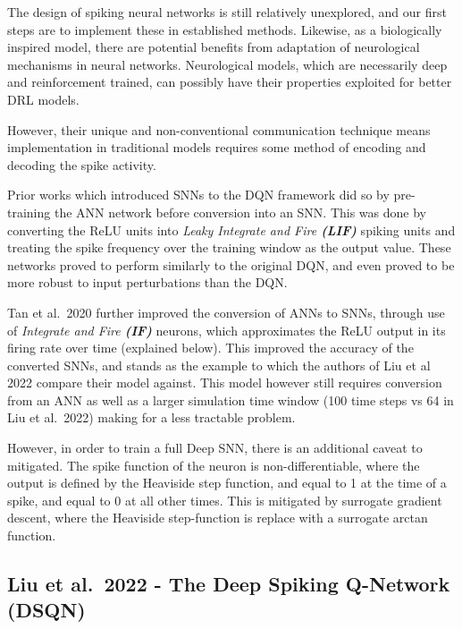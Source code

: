 \documentclass[
]{article}
\begin{document}
The design of spiking neural networks is still relatively unexplored,
and our first steps are to implement these in established methods.
Likewise, as a biologically inspired model, there are potential benefits
from adaptation of neurological mechanisms in neural networks.
Neurological models, which are necessarily deep and reinforcement
trained, can possibly have their properties exploited for better DRL
models.

However, their unique and non-conventional communication technique means
implementation in traditional models requires some method of encoding
and decoding the spike activity.

Prior works which introduced SNNs to the DQN framework did so by
pre-training the ANN network before conversion into an SNN. This was
done by converting the ReLU units into \emph{Leaky Integrate and Fire
\textbf{(LIF)}} spiking units
\autocite{patelImprovedRobustnessReinforcement2019} and treating
the spike frequency over the training window as the output value. These
networks proved to perform similarly to the original DQN, and even
proved to be more robust to input perturbations than the DQN.

Tan et al.~2020 further improved the conversion of ANNs to SNNs, through
use of \emph{Integrate and Fire \textbf{(IF)}} neurons, which
approximates the ReLU output in its firing rate over time (explained
below). This improved the accuracy of the converted SNNs, and stands as
the example to which the authors of Liu et al 2022 compare their model
against. This model however still requires conversion from an ANN as
well as a larger simulation time window (100 time steps vs 64 in Liu et
al.~2022) making for a less tractable problem.

However, in order to train a full Deep SNN, there is an additional
caveat to mitigated. The spike function of the neuron is
non-differentiable, where the output is defined by the Heaviside step
function, and equal to 1 at the time of a spike, and equal to 0 at all
other times. This is mitigated by surrogate gradient descent, where the
Heaviside step-function is replace with a surrogate arctan function.

\hypertarget{liu-et-al.-2022---the-deep-spiking-q-network-dsqn}{%
\subsection{Liu et al.~2022 - The Deep Spiking Q-Network
(DSQN)}\label{liu-et-al.-2022---the-deep-spiking-q-network-dsqn}}
\end{document}
